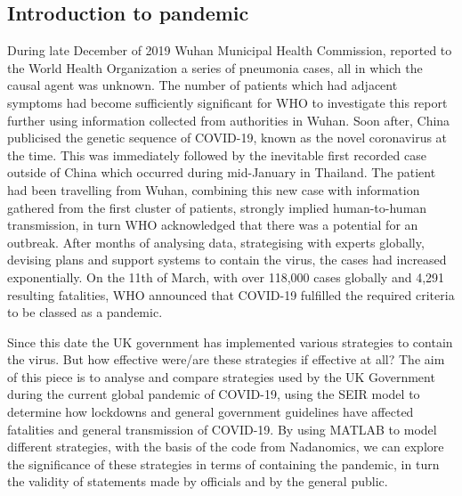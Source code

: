 \documentclass[11pt]{article}
\begin{document}
\subsection{Introduction to pandemic}
During late December of 2019 Wuhan Municipal Health Commission, reported to the World Health Organization a series of pneumonia cases, all in which the causal agent was unknown. The number of patients which had adjacent symptoms had become sufficiently significant for WHO to investigate this report further using information collected from authorities in Wuhan. Soon after, China publicised the genetic sequence of COVID-19, known as the novel coronavirus at the time. This was immediately followed by the inevitable first recorded case outside of China which occurred during mid-January in Thailand. The patient had been travelling from Wuhan, combining this new case with information gathered from the first cluster of patients, strongly implied human-to-human transmission, in turn WHO acknowledged that there was a potential for an outbreak. After months of analysing data, strategising with experts globally, devising plans and support systems to contain the virus, the cases had increased exponentially. On the 11th of March, with over 118,000 cases globally and 4,291 resulting fatalities, WHO announced that COVID-19 fulfilled the required criteria to be classed as a pandemic\citep{WHO'stimelineofCOVID-19}. \par
Since this date the UK government has implemented various strategies to contain the virus. But how effective were/are these strategies if effective at all? The aim of this piece is to analyse and compare strategies used by the UK Government during the current global pandemic of COVID-19, using the SEIR model to determine how lockdowns and general government guidelines have affected fatalities and general transmission of COVID-19. By using MATLAB to model different strategies, with the basis of the code from Nadanomics\citep{MODEL}, we can explore the significance of these strategies in terms of containing the pandemic, in turn the validity of statements made by officials and by the general public.
\end{document}
